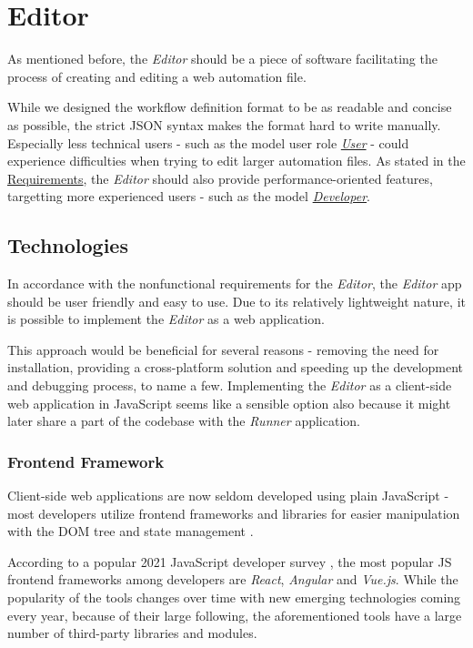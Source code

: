 \section{Editor} \label{sec:editor}

As mentioned before, the \textit{Editor} should be a piece of software facilitating the process of creating and editing a web automation file.

While we designed the workflow definition format to be as readable and concise as possible, the strict JSON syntax makes the format hard to write manually.
Especially less technical users - such as the model user role \hyperref[UserUserRole]{\textit{User}} - could experience difficulties when trying to edit 
larger automation files. 
As stated in the \hyperref[requirements]{Requirements}, the \textit{Editor} should also provide performance-oriented features,
targetting more experienced users - such as the model \hyperref[DevUserRole]{\textit{Developer}}.

\subsection{Technologies}
In accordance with the nonfunctional requirements for the \textit{Editor}, the \textit{Editor} app should be user friendly and easy to use.
Due to its relatively lightweight nature, it is possible to implement the \textit{Editor} as a web application. 

This approach would be beneficial for several reasons - removing the need for installation, providing a cross-platform solution and speeding up the development and debugging process, to name a few.
Implementing the \textit{Editor} as a client-side web application in JavaScript seems like a sensible option also because it might later share a part of the codebase with the \textit{Runner} application.

\subsubsection{Frontend Framework}

Client-side web applications are now seldom developed using plain JavaScript - most developers utilize frontend frameworks and libraries for easier manipulation with the \ac{DOM} tree and state management .

According to a popular 2021 JavaScript developer survey , the most popular \ac{JS} frontend frameworks among developers are \textit{React}, \textit{Angular} and \textit{Vue.js}.
While the popularity of the tools changes over time with new emerging technologies coming every year, because of their large following, the aforementioned tools have a large number of third-party libraries 
and modules.

